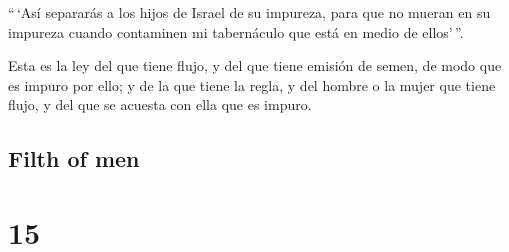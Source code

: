 \begin{paracol}{2}
 ``\,`Así separarás a los hijos de Israel de su impureza,
para que no mueran en su impureza cuando contaminen mi tabernáculo que
está en medio de ellos'\,''.

 Esta es la ley del que tiene flujo, y del que tiene
emisión de semen, de modo que es impuro por ello;  y de
la que tiene la regla, y del hombre o la mujer que tiene flujo, y del
que se acuesta con ella que es impuro.

\switchcolumn
\begin{otherlanguage}{english}

\hypertarget{filth-of-men}{%
\subsection{Filth of men}\label{filth-of-men}}

\hypertarget{section-29}{%
\section{15}\label{section-29}}


\end{otherlanguage}
\end{paracol}
